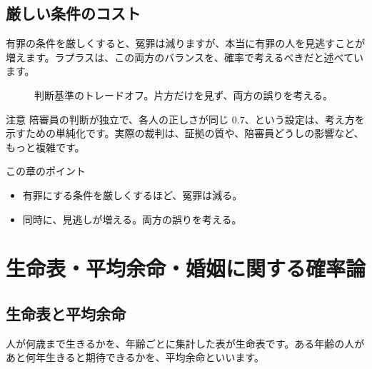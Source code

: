 \documentclass[a4paper,11pt,openany]{ltjsbook}
\begin{document}
\section{厳しい条件のコスト}

有罪の条件を厳しくすると、冤罪は減りますが、本当に有罪の人を見逃すことが増えます。ラプラスは、この両方のバランスを、確率で考えるべきだと述べています。

\begin{figure}[htbp]
\centering
{}
\caption{判断基準のトレードオフ。片方だけを見ず、両方の誤りを考える。}
\end{figure}

\begin{notebox}{注意}
陪審員の判断が独立で、各人の正しさが同じ $0.7$、という設定は、考え方を示すための単純化です。実際の裁判は、証拠の質や、陪審員どうしの影響など、もっと複雑です。
\end{notebox}

\begin{pointbox}{この章のポイント}
\begin{itemize}[leftmargin=1.5em]
\item 有罪にする条件を厳しくするほど、冤罪は減る。
\item 同時に、見逃しが増える。両方の誤りを考える。
\end{itemize}
\end{pointbox}

\chapter{生命表・平均余命・婚姻に関する確率論}

\section{生命表と平均余命}

人が何歳まで生きるかを、年齢ごとに集計した表が生命表です。ある年齢の人があと何年生きると期待できるかを、平均余命といいます。
\end{document}

